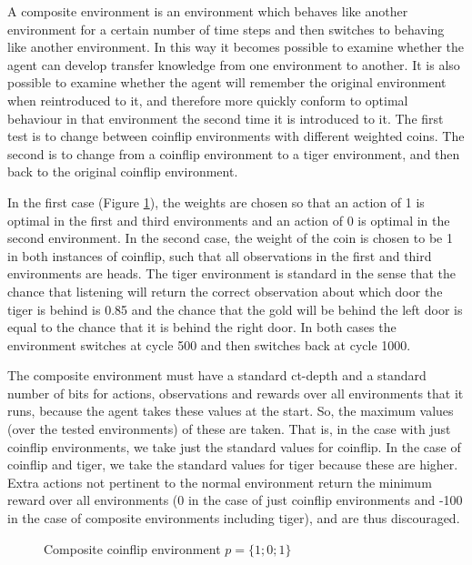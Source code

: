 \documentclass[pdftex,twoside,a4paper]{report}
\begin{document}
A composite environment is an environment which behaves like another environment for a certain number of time steps and then switches to behaving like another environment. In this way it becomes possible to examine whether the agent can develop transfer knowledge from one environment to another. It is also possible to examine whether the agent will remember the original environment when reintroduced to it, and therefore more quickly conform to optimal behaviour in that environment the second time it is introduced to it. The first test is to change between coinflip environments with different weighted coins. The second is to change from a coinflip environment to a tiger environment, and then back to the original coinflip environment.  

In the first case (Figure \ref{fig:coin_comp101}), the weights are chosen so that an action of 1 is optimal in the first and third environments and an action of 0 is optimal in the second environment. In the second case, the weight of the coin is chosen to be 1 in both instances of  coinflip, such that all observations in the first and third environments are heads. The tiger environment is standard in the sense that the chance that listening will return the correct observation about which door the tiger is behind is 0.85 and the chance that the gold will be behind the left door is equal to the chance that it is behind the right door. In both cases the environment switches at cycle 500 and then switches back at cycle 1000.

The composite environment must have a standard ct-depth and a standard number of bits for actions, observations and rewards over all environments that it runs, because the agent takes these values at the start. So, the maximum values (over the tested environments) of these are taken. That is, in the case with just coinflip environments, we take just the standard values for coinflip. In the case of coinflip and tiger, we take the standard values for tiger because these are higher. Extra actions not pertinent to the normal environment return the minimum reward over all environments (0 in the case of just coinflip environments and -100 in the case of composite environments including tiger), and are thus discouraged.

\begin{figure}
  \begin{center}
  \end{center}
  \caption{Composite coinflip environment $p=\{1;0;1\}$}
  \label{fig:coin_comp101}
\end{figure}



\end{document}
